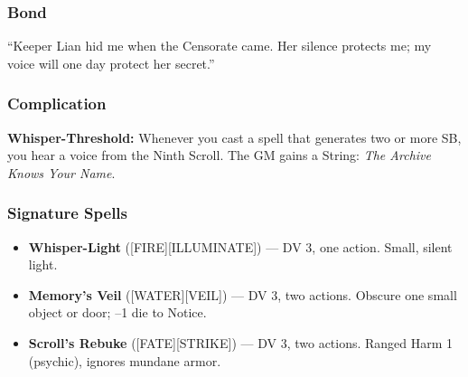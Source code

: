 \subsubsection*{Bond}
``Keeper Lian hid me when the Censorate came. Her silence protects me; my voice will one day protect her secret.''

\subsubsection*{Complication}
\textbf{Whisper-Threshold:} Whenever you cast a spell that generates two or more SB, you hear a voice from the Ninth Scroll. The GM gains a String: \textit{The Archive Knows Your Name}.

\subsubsection*{Signature Spells}
\begin{itemize}
  \item \textbf{Whisper-Light} ([FIRE][ILLUMINATE]) --- DV 3, one action. Small, silent light.
  \item \textbf{Memory's Veil} ([WATER][VEIL]) --- DV 3, two actions. Obscure one small object or door; --1 die to Notice.
  \item \textbf{Scroll's Rebuke} ([FATE][STRIKE]) --- DV 3, two actions. Ranged Harm 1 (psychic), ignores mundane armor.
\end{itemize}


